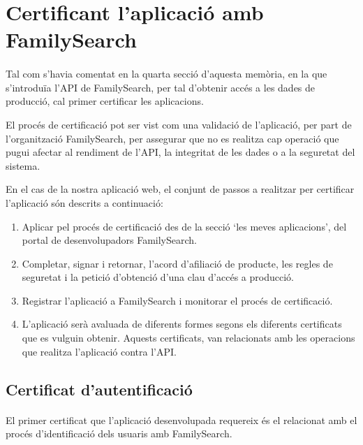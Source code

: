 \section{Certificant l'aplicació amb FamilySearch}\label{section:certification}

    \paragraph{}
    Tal com s'havia comentat en la quarta secció d'aquesta memòria, en la que s'in\-tro\-duïa l'API de FamilySearch, per tal d'obtenir accés a les dades de producció, cal primer certificar les aplicacions.

    El procés de certificació pot ser vist com una validació de l'aplicació, per part de l'organització FamilySearch, per assegurar que no es realitza cap operació que pugui afectar al rendiment de l'API, la integritat de les dades o a la seguretat del sistema.

    En el cas de la nostra aplicació web, el conjunt de passos a realitzar per certificar l'aplicació són descrits a continuació:

    \begin{enumerate}
        \item Aplicar pel procés de certificació des de la secció `les meves aplicacions', del portal de desenvolupadors FamilySearch.
        \item Completar, signar i retornar, l'acord d'afiliació de producte, les regles de seguretat i la petició d'obtenció d'una clau d'accés a producció.
        \item Registrar l'aplicació a FamilySearch i monitorar el procés de certificació.
        \item L'aplicació serà avaluada de diferents formes segons els diferents certificats que es vulguin obtenir. Aquests certificats, van relacionats amb les operacions que realitza l'aplicació contra l'API.
    \end{enumerate}


    \subsection{Certificat d'autentificació}

    \paragraph{}
    El primer certificat que l'aplicació desenvolupada requereix és el relacionat amb el procés d'identificació dels usuaris amb FamilySearch.

